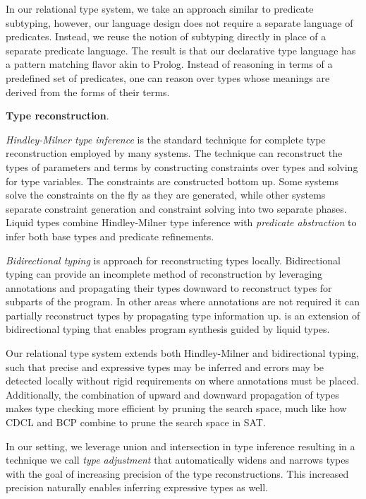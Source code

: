 \documentclass[sigplan]{acmart}
\theoremstyle{definition}
\begin{document}
In our relational type system, we take an approach similar to predicate subtyping, however, our language design does not require
a separate language of predicates. Instead, we reuse the notion of subtyping directly in place of a separate predicate language.
The result is that our declarative type language has a pattern matching flavor akin to Prolog. 
Instead of reasoning in terms of a predefined set of predicates, 
one can reason over types whose meanings are derived from the forms of their terms.
\newline

\noindent
\textbf{Type reconstruction}.

\textit{Hindley-Milner type inference} \cite{} is the standard technique for complete type reconstruction employed
by many systems. The technique can reconstruct the types of parameters 
and terms by constructing constraints over types and solving for type variables. 
The constraints are constructed bottom up. Some systems solve the constraints on the fly  
as they are generated, while other systems separate constraint generation and constraint
solving into two separate phases. 
Liquid types combine Hindley-Milner type inference 
with \textit{predicate abstraction}\cite{} to infer both base types and predicate refinements.

\textit{Bidirectional typing} is approach for reconstructing types locally\cite{}.
Bidirectional typing can provide an incomplete method of reconstruction by leveraging
annotations and propagating their types downward to reconstruct types 
for subparts of the program. 
In other areas where annotations are not required it can partially
reconstruct types by propagating type information up. 
 \cite{} is an extension of 
bidirectional typing that enables program synthesis guided by liquid types. 

Our relational type system extends both Hindley-Milner and bidirectional typing, 
such that precise and expressive types may be inferred and errors may be detected locally
without rigid requirements on where annotations must be placed.  
Additionally, the combination of upward and downward propagation of types 
makes type checking more efficient by pruning the search space, 
much like how CDCL and BCP combine to prune the search space in SAT. 

In our setting, we leverage union and intersection in type inference
resulting in a technique we call \textit{type adjustment} that automatically widens and narrows types 
with the goal of increasing precision of the type reconstructions. This increased precision naturally
enables inferring expressive types as well.
\end{document}
